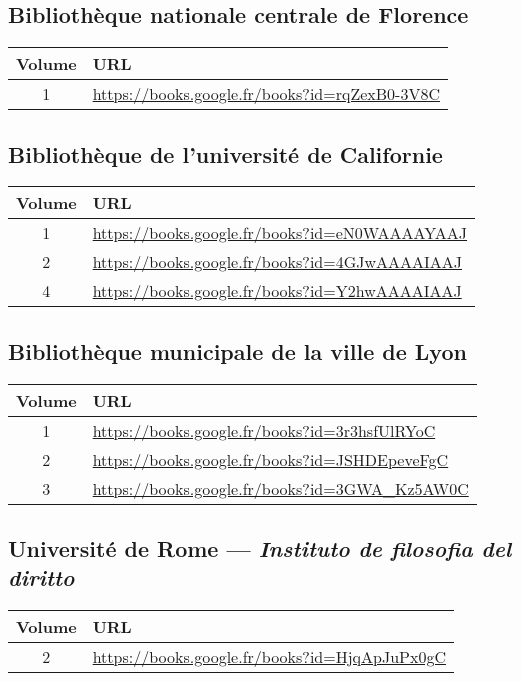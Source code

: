 \subsection{Bibliothèque nationale centrale de Florence}
\begin{center}
\begin{tabular}{ | c | p{13cm} | }
\hline
Volume & URL \\ \hline
1 & \url{https://books.google.fr/books?id=rqZexB0-3V8C} \\ \hline
\end{tabular}
\end{center}

\subsection{Bibliothèque de l'université de Californie}
\begin{center}
\begin{tabular}{ | c | p{13cm} | }
\hline
Volume & URL \\ \hline
1 & \url{https://books.google.fr/books?id=eN0WAAAAYAAJ} \\ \hline
2 & \url{https://books.google.fr/books?id=4GJwAAAAIAAJ} \\ \hline
4 & \url{https://books.google.fr/books?id=Y2hwAAAAIAAJ} \\ \hline
\end{tabular}
\end{center}

\subsection{Bibliothèque municipale de la ville de Lyon}
\begin{center}
\begin{tabular}{ | c | p{13cm} | }
\hline
Volume & URL \\ \hline
1 & \url{https://books.google.fr/books?id=3r3hsfUlRYoC} \\ \hline
2 & \url{https://books.google.fr/books?id=JSHDEpeveFgC} \\ \hline
3 & \url{https://books.google.fr/books?id=3GWA_Kz5AW0C} \\ \hline
\end{tabular}
\end{center}

\subsection{Université de Rome --- \textit{Instituto de filosofia del diritto}}
\begin{center}
\begin{tabular}{ | c | p{13cm} | }
\hline
Volume & URL \\ \hline
2 & \url{https://books.google.fr/books?id=HjqApJuPx0gC} \\ \hline
\end{tabular}
\end{center}

